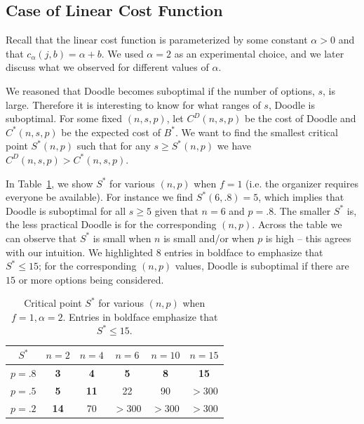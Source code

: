 
\subsection{Case of Linear Cost Function} \label{bdoodle:sec:result_linear_cost}
Recall that the linear cost function is parameterized by some constant $\alpha>0$ and that $c_{\alpha}(j, b) = \alpha + b$. We used $\alpha = 2$ as an experimental choice, and we later discuss what we observed for different values of $\alpha$.

We reasoned that Doodle becomes suboptimal if the number of options, $s$, is large. Therefore it is interesting to know for what ranges of $s$, Doodle is suboptimal. For some fixed $(n, s, p)$, let $C^D(n, s, p)$ be the cost of Doodle and $C^*(n, s, p)$ be the expected cost of $B^*$. We want to find the smallest critical point $S^*(n, p)$ such that for any $s \geq S^*(n, p)$ we have $C^D(n, s, p) > C^*(n, s, p)$.

In Table~\ref{bdoodle:table:DoodleSuboptimal}, we show $S^*$ for various $(n, p)$ when $f = 1$ (i.e. the organizer requires everyone be available). For instance we find $S^*(6, .8) = 5$, which implies that Doodle is suboptimal for all $s \geq 5$ given that $n=6$ and $p=.8$. The smaller $S^*$ is, the less practical Doodle is for the corresponding $(n, p)$.
Across the table we can observe that $S^*$ is small when $n$ is small and/or when $p$ is high -- this agrees with our intuition.
We highlighted $8$ entries in boldface to emphasize that $S^* \leq 15$; for the corresponding $(n, p)$ values, Doodle is suboptimal if there are $15$ or more options being considered.
\begin{table}[h!]  %
\centering
\begin{tabular}{|c|c|c|c|c|c|}
	\hline
	$S^*$ & $n = 2$ & $n = 4$ & $n = 6$ & $ n = 10 $ & $n = 15$ \\ \hline
	$p = .8$ & \textbf{3} & \textbf{4} & \textbf{5} & \textbf{8} & \textbf{15} \\ \hline
	$p = .5$ & \textbf{5} & \textbf{11} & 22 & 90 & $>300$\\ \hline
	$p = .2$ & \textbf{14} & 70 & $>300$ & $>300$ & $>300$ \\ \hline
\end{tabular}
\caption{Critical point $S^*$ for various $(n, p)$ when $f = 1, \alpha = 2$.
Entries in boldface emphasize that $S^* \leq 15$.
} \label{bdoodle:table:DoodleSuboptimal}
\end{table}


